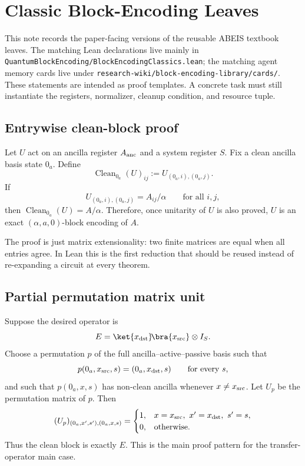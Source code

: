 \section{Classic Block-Encoding Leaves}
\label{sec:classic-be-leaves}

This note records the paper-facing versions of the reusable ABEIS textbook
leaves.  The matching Lean declarations live mainly in
\texttt{QuantumBlockEncoding/BlockEncodingClassics.lean}; the matching agent
memory cards live under
\texttt{research-wiki/block-encoding-library/cards/}.  These statements are
intended as proof templates.  A concrete task must still instantiate the
registers, normalizer, cleanup condition, and resource tuple.

\subsection{Entrywise clean-block proof}

Let \(U\) act on an ancilla register \(A_{\rm anc}\) and a system register
\(S\).  Fix a clean ancilla basis state \(0_a\).  Define
\[
  \operatorname{Clean}_{0_a}(U)_{ij}
  := U_{(0_a,i),(0_a,j)} .
\]
If
\[
  U_{(0_a,i),(0_a,j)} = A_{ij}/\alpha
  \qquad\text{for all }i,j,
\]
then \(\operatorname{Clean}_{0_a}(U)=A/\alpha\).  Therefore, once unitarity of
\(U\) is also proved, \(U\) is an exact \((\alpha,a,0)\)-block encoding of
\(A\).

The proof is just matrix extensionality: two finite matrices are equal when
all entries agree.  In Lean this is the first reduction that should be reused
instead of re-expanding a circuit at every theorem.

\subsection{Partial permutation matrix unit}

Suppose the desired operator is
\[
  E = \ket{x_{\rm dst}}\!\bra{x_{\rm src}}\otimes I_S .
\]
Choose a permutation \(p\) of the full ancilla--active--passive basis such that
\[
  p(0_a,x_{\rm src},s)=(0_a,x_{\rm dst},s)
  \qquad\text{for every }s,
\]
and such that \(p(0_a,x,s)\) has non-clean ancilla whenever
\(x\neq x_{\rm src}\).  Let \(U_p\) be the permutation matrix of \(p\).  Then
\[
  (U_p)_{(0_a,x',s'),(0_a,x,s)}
  =
  \begin{cases}
  1, & x=x_{\rm src},\ x'=x_{\rm dst},\ s'=s,\\
  0, & \text{otherwise}.
  \end{cases}
\]
Thus the clean block is exactly \(E\).  This is the main proof pattern for the
transfer-operator main case.

